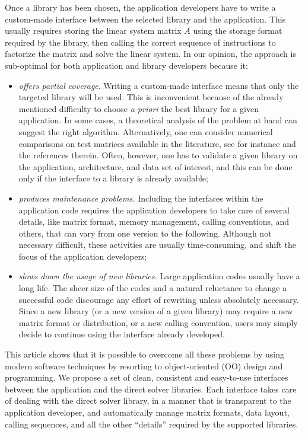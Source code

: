 \documentclass[acmtocl]{acmtrans2m}
\begin{document}
Once a library has been chosen, the application developers have to
write a custom-made interface between the selected library and
the application. This usually requires storing the linear system matrix $A$
using the
  storage format required by the library, then calling the correct sequence of
  instructions to factorize the matrix and solve the linear system.  In our
  opinion, the approach is sub-optimal for both application and library
  developers because it:
\begin{itemize}

\item 
{\sl offers partial coverage}. Writing a custom-made interface means that only the
targeted library will be used.
This is inconvenient because of the already mentioned difficulty to choose
{\sl a-priori} the best library for a given application.
In some cases, a theoretical analysis of
the problem at hand can suggest the right algorithm. Alternatively, one can
consider numerical comparisons on test matrices available in the literature,
see for instance \cite{amestoy01analysis,gupta01recent} and
the references therein. Often, however, one has to validate
a given library on the application, architecture, and data
set of interest, and this can be done only if the interface  to a library
is already available;

\item 
{\sl produces maintenance problems.}
Including the interfaces within the application code requires the application
developers to take care of several details, like matrix format, memory
management, calling conventions, and others, that can vary 
from one version to the following. Although not necessary difficult, these
activities are usually time-consuming, and shift the focus of the application
developers;

\item 
{\sl slows down the usage of new libraries.} 
Large application codes usually have a long life.  The sheer size of
the codes and a natural reluctance to change a successful code discourage any
effort of rewriting unless absolutely necessary.
Since a new library 
(or a new version of a given library) may require a new matrix format or
distribution, or a new calling convention, users may simply decide to continue
using the interface already developed.
\end{itemize}

This article shows that it is possible to overcome all these problems by using
modern software techniques by resorting to object-oriented (OO) design and
programming.  We propose a set of clean, consistent and easy-to-use interfaces
between the application and the direct solver libraries.  Each interface takes
care of dealing with the direct solver library, in a manner that is
transparent to the application developer, and automatically manage matrix
formats, data layout, calling sequences, and all the other ``details''
required by the supported libraries. 
\end{document}
